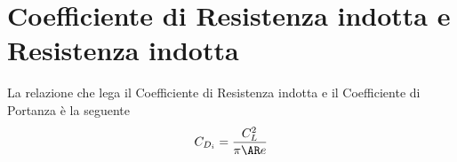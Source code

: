\newpage
\section{ Coefficiente di Resistenza indotta e Resistenza indotta}

La relazione che lega il Coefficiente di Resistenza indotta e il Coefficiente di Portanza  è la seguente \\

\begin{equation}
\label{eqn:cdi}
C_{D_ i}=\frac {C_L^2}{{\pi}{\AR}e}
\end{equation}
